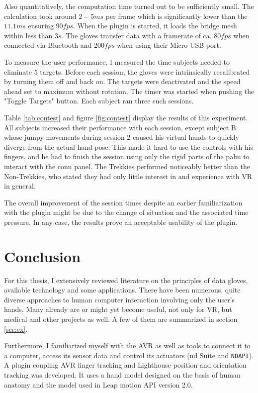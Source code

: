 \documentclass[hyperref, bachelorofscience]{cgvpub}
\begin{document}
Also quantitatively, the computation time turned out to be sufficiently small. The calculation took around $ 2-5ms $ per frame which is significantly lower than the $ 11.1ms $ ensuring $ 90fps $. When the plugin is started, it loads the bridge mesh within less than $ 3s $. The gloves transfer data with a framerate of ca. $ 80fps $ when connected via Bluetooth and $ 200fps $ when using their Micro USB port. 

To measure the user performance, I measured the time subjects needed to eliminate $ 5 $ targets. Before each session, the gloves were intrinsically recalibrated by turning them off and back on. The targets were deactivated and the speed ahead set to maximum without rotation. The timer was started when pushing the "Toggle Targets" button. Each subject ran three such sessions.

Table \ref{tab:contest} and figure \ref{fig:contest} display the results of this experiment. All subjects increased their performance with each session, except subject B whose jumpy movements during session 2 caused his virtual hands to quickly diverge from the actual hand pose. This made it hard to use the controls with his fingers, and he had to finish the session using only the rigid parts of the palm to interact with the conn panel. The Trekkies performed noticeably better than the Non-Trekkies, who stated they had only little interest in and experience with VR in general. 

The overall improvement of the session times despite an earlier familiarization with the plugin might be due to the change of situation and the associated time pressure. In any case, the results prove an acceptable usability of the plugin.

\chapter{Conclusion}
For this thesis, I extensively reviewed literature on the principles of data gloves, available technology and some applications. There have been numerous, quite diverse approaches to human computer interaction involving only the user's hands. Many already are or might yet become useful, not only for VR, but medical and other projects as well. A few of them are summarized in section \ref{sec:ex}.

Furthermore, I familiarized myself with the \Gls{AVR} as well as tools to connect it to a computer, access its sensor data and control its actuators (\acrshort{nd} Suite and \lstinline|NDAPI|). A plugin coupling \Gls{AVR} finger tracking and Lighthouse position and orientation tracking was developed. It uses a hand model designed on the basis of human anatomy and the model used in Leap motion API version 2.0. 
\end{document}
